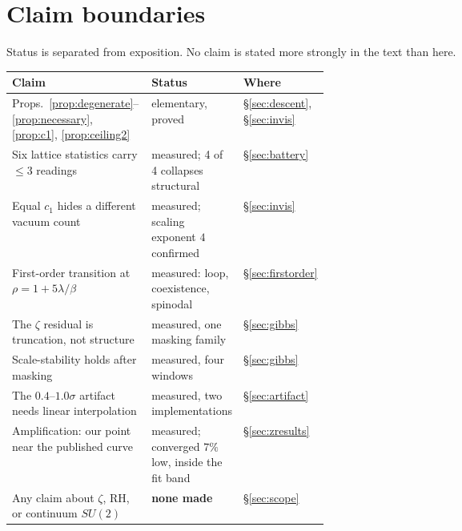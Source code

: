 \documentclass[11pt]{article}
\theoremstyle{remark}
\begin{document}
\begin{center}\small{}\end{center}

\section{Claim boundaries}\label{sec:status}

Status is separated from exposition. No claim is stated more strongly in the text than
here.

\begin{center}\small
\begin{tabular}{p{0.46\linewidth}ll}
\toprule
Claim & Status & Where \\
\midrule
Props.~\ref{prop:degenerate}--\ref{prop:necessary}, \ref{prop:c1}, \ref{prop:ceiling2} & elementary, proved & \S\ref{sec:descent}, \S\ref{sec:invis} \\
Six lattice statistics carry $\le3$ readings & measured; 4 of 4 collapses structural & \S\ref{sec:battery} \\
Equal $c_1$ hides a different vacuum count & measured; scaling exponent $4$ confirmed & \S\ref{sec:invis} \\
First-order transition at $\rho=1+5\lambda/\beta$ & measured: loop, coexistence, spinodal & \S\ref{sec:firstorder} \\
The $\zeta$ residual is truncation, not structure & measured, one masking family & \S\ref{sec:gibbs} \\
Scale-stability holds after masking & measured, four windows & \S\ref{sec:gibbs} \\
The $0.4$--$1.0\sigma$ artifact needs linear interpolation & measured, two implementations & \S\ref{sec:artifact} \\
Amplification: our point near the published curve & measured; converged $7\%$ low, inside the fit band & \S\ref{sec:zresults} \\
Any claim about $\zeta$, RH, or continuum $SU(2)$ & \textbf{none made} & \S\ref{sec:scope} \\
\bottomrule
\end{tabular}
\end{center}
\end{document}
